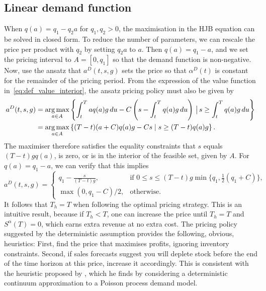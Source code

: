 \documentclass[main.tex]{subfiles}
\begin{document}
\subsection{Linear demand function}
When $q(a)=q_1-q_2a$ for $q_1,q_2>0$, the maximisation in the HJB
equation can be solved in closed form.
To reduce the number of parameters, we can rescale the price per
product with $q_2$ by setting $q_2a$ to $a$.
Then $q(a)=q_1-a$, and we set the pricing interval to $A=[0,q_1]$ so that the demand
function is non-negative.
Now, use the ansatz that $a^D(t,s,g)$ sets the price so that
$\alpha^D(t)$ is
constant for the remainder of the pricing period.
From the expression of the value function
in~\eqref{eq:def_value_interior}, the ansatz pricing policy must
also be given by
\begin{align}
  a^D(t,s,g)
  &=\operatorname*{arg\,max}_{a\in A}\left\{\int_t^Taq(a)g\,du -
    C\left(s-\int_t^Tq(a)g\,du\right) \,\big|\,  s \geq \int_t^Tq(a)g\,du\right\}\\
  &=\operatorname*{arg\,max}_{a\in A}\left\{(T-t)(a+C)q(a)g-Cs \mid  s \geq
    (T-t)q(a)g\right\}.
\end{align}
The maximiser therefore satisfies the equality constraints that
$s$ equals $(T-t)gq(a)$, is zero, or is in the interior of the feasible set,
given by $A$.
For $q(a)=q_1-a$, we can verify that this implies
\begin{equation}\label{eq:astar_linear}
  a^D(t,s,g)=\begin{cases}
    q_1-\frac{s}{(T-t)g}, &\text{if } 0\leq s\leq
    (T-t)g\min\{q_1,\frac{1}{2}(q_1 +C)\},\\
    \max(0,q_1-C)/2,&\text{otherwise.}
  \end{cases}
\end{equation}
It follows that $T_h=T$ when following the optimal pricing strategy.
This is an intuitive result, because if $T_h<T$, one can increase the
price until $T_h=T$ and $S^\alpha(T)=0$, which earns extra revenue at no extra cost.
The pricing policy suggested by the
deterministic assumption provides the following, obvious, heuristics:
First, find the price that maximises profits, ignoring inventory
constraints. Second, if sales forecasts suggest you will deplete stock
before the end of the time horizon at this price, increase it
accordingly. This is consistent with the heuristic proposed
by \citet{schlosser2015dynamic1,schlosser2015dynamic2}, which
he finds by considering a deterministic continuum
approximation to a Poisson process demand model.
\end{document}
